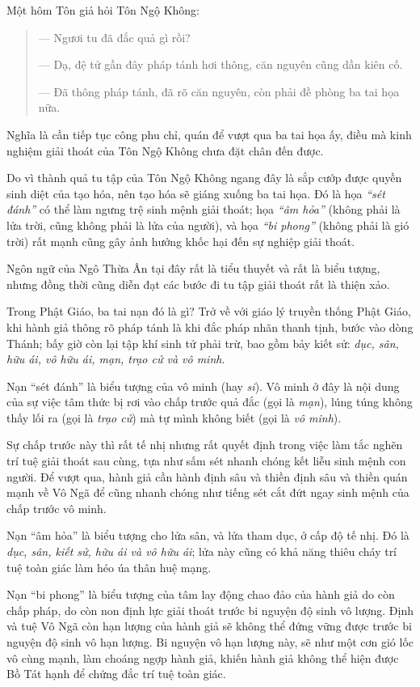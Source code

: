 Một hôm Tôn giả hỏi Tôn Ngộ Không:

\begin{quote}
--- Ngươi tu đã đắc quả gì rồi?

--- Dạ, đệ tử gần đây pháp tánh hơi thông, căn nguyên cũng dần kiên cố.

--- Đã thông pháp tánh, đã rõ căn nguyên, còn phải đề phòng ba tai họa nữa.
\end{quote}
Nghĩa là cần tiếp tục công phu chỉ, quán để vượt qua ba tai họa ấy, điều mà kinh nghiệm giải thoát của Tôn Ngộ Không chưa đặt chân đến được.

Do vì thành quả tu tập của Tôn Ngộ Không ngang đây là sắp cướp được quyền sinh diệt của tạo hóa, nên tạo hóa sẽ giáng xuống ba tai họa. Đó là họa \emph{``sét đánh''} có thể làm ngưng trệ sinh mệnh giải thoát; họa \emph{``âm hỏa''} (không phải là lửa trời, cũng không phải là lửa của người), và họa \emph{``bi phong''} (không phải là gió trời) rất mạnh cũng gây ảnh hưởng khốc hại đến sự nghiệp giải thoát.

Ngôn ngữ của Ngô Thừa Ân tại đây rất là tiểu thuyết và rất là biểu tượng, nhưng đồng thời cũng diễn đạt các bước đi tu tập giải thoát rất là thiện xảo.

Trong Phật Giáo, ba tai nạn đó là gì? Trở về với giáo lý truyền thống Phật Giáo, khi hành giả thông rõ pháp tánh là khi đắc pháp nhãn thanh tịnh, bước vào dòng Thánh; bấy giờ còn lại tập khí sinh tử phải trừ, bao gồm bảy kiết sử: \emph{dục, sân, hữu ái, vô hữu ái, mạn, trạo cử và vô minh}.

Nạn ``sét đánh'' là biểu tượng của vô minh (hay \emph{si}). Vô minh ở đây là nội dung của sự việc tâm thức bị rơi vào chấp trước quả đắc (gọi là \emph{mạn}), lúng túng không thấy lối ra (gọi là \emph{trạo cử}) mà tự mình không biết (gọi là \emph{vô minh}).

Sự chấp trước này thì rất tế nhị nhưng rất quyết định trong việc làm tắc nghẽn trí tuệ giải thoát sau cùng, tựa như sấm sét nhanh chóng kết liễu sinh mệnh con người. Để vượt qua, hành giả cần hành định sâu và thiền định sâu và thiền quán mạnh về Vô Ngã để cũng nhanh chóng như tiếng sét cắt đứt ngay sinh mệnh của chấp trước vô minh.

Nạn ``âm hỏa'' là biểu tượng cho lửa sân, và lửa tham dục, ở cấp độ tế nhị. Đó là \emph{dục, sân, kiết sử, hữu ái và vô hữu ái}; lửa này cũng có khả năng thiêu cháy trí tuệ toàn giác làm héo úa thân huệ mạng.

Nạn ``bi phong'' là biểu tượng của tâm lay động chao đảo của hành giả do còn chấp pháp, do còn non định lực giải thoát trước bi nguyện độ sinh vô lượng. Định và tuệ Vô Ngã còn hạn lượng của hành giả sẽ không thể đứng vững được trước bi nguyện độ sinh vô hạn lượng. Bi nguyện vô hạn lượng này, sẽ như một cơn gió lốc vô cùng mạnh, làm choáng ngợp hành giả, khiến hành giả không thể hiện được Bồ Tát hạnh để chứng đắc trí tuệ toàn giác.

